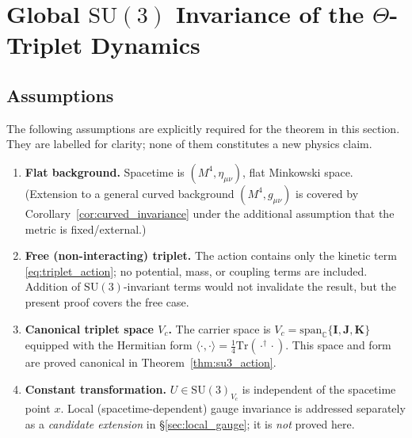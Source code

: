 %
%

\section{Global $\mathrm{SU}(3)$ Invariance of the $\Theta$-Triplet Dynamics}
\label{sec:global_invariance}

\subsection{Assumptions}
\label{subsec:global_assumptions}

The following assumptions are explicitly required for the theorem in this section.
They are labelled for clarity; none of them constitutes a new physics claim.

\begin{enumerate}[label=\textbf{A\arabic*.}]
  \item \textbf{Flat background.} Spacetime is $(M^4, \eta_{\mu\nu})$, flat
    Minkowski space.  (Extension to a general curved background
    $(M^4, g_{\mu\nu})$ is covered by Corollary~\ref{cor:curved_invariance}
    under the additional assumption that the metric is fixed/external.)
  \item \textbf{Free (non-interacting) triplet.} The action contains only the
    kinetic term \eqref{eq:triplet_action}; no potential, mass, or coupling
    terms are included.  Addition of $\mathrm{SU}(3)$-invariant terms would
    not invalidate the result, but the present proof covers the free case.
  \item \textbf{Canonical triplet space $V_c$.}  The carrier space is
    $V_c = \mathrm{span}_\mathbb{C}\{\mathbf{I},\mathbf{J},\mathbf{K}\}$
    equipped with the Hermitian form $\langle\cdot,\cdot\rangle =
    \tfrac{1}{4}\mathrm{Tr}(\cdot^\dagger\cdot)$.  This space and form are
    proved canonical in Theorem~\ref{thm:su3_action}.
  \item \textbf{Constant transformation.} $U\in\mathrm{SU}(3)_{V_c}$ is
    independent of the spacetime point $x$.  Local (spacetime-dependent)
    gauge invariance is addressed separately as a \emph{candidate extension}
    in \S\ref{sec:local_gauge}; it is \emph{not} proved here.
\end{enumerate}

